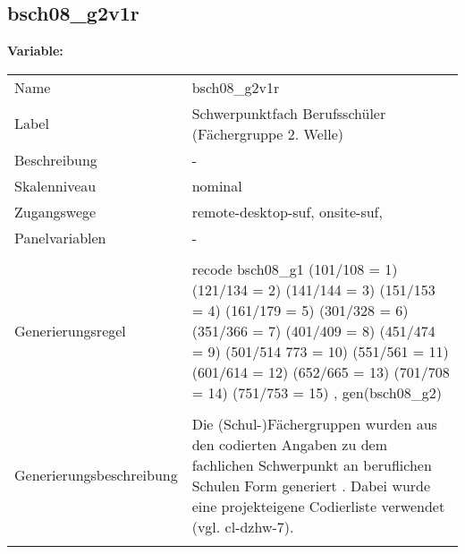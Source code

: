 	
	
	\subsection{bsch08\_g2v1r}
	\label{subSection:bsch08_g2v1r}

	\noindent\textbf{Variable:}\\
		\begin{tabular}{lL{11.3cm}}
			\label{tableVariable:bsch08_g2v1r}
			Name & bsch08\_g2v1r \\
			Label & Schwerpunktfach Berufsschüler (Fächergruppe 2. Welle) \\
			Beschreibung & - \\
			Skalenniveau & nominal \\
			Zugangswege &
				remote-desktop-suf,
				onsite-suf,
 \\
			Panelvariablen & -
			 \\
			 \\
					Generierungsregel & recode bsch08\_g1 (101/108 = 1) (121/134 = 2) (141/144 = 3) 
(151/153 = 4) (161/179 = 5) (301/328 = 6) (351/366 = 7) 
(401/409 = 8) (451/474 = 9) (501/514 773 = 10) (551/561 = 11) 
(601/614 = 12) (652/665 = 13) (701/708 = 14) (751/753 = 15)
, gen(bsch08\_g2) \\
				 \\
					Generierungsbeschreibung & Die (Schul-)Fächergruppen wurden aus den codierten Angaben zu dem fachlichen Schwerpunkt an beruflichen Schulen  Form generiert . Dabei wurde eine projekteigene Codierliste verwendet (vgl. cl-dzhw-7).
				 \\	
			 \\
		\end{tabular}






